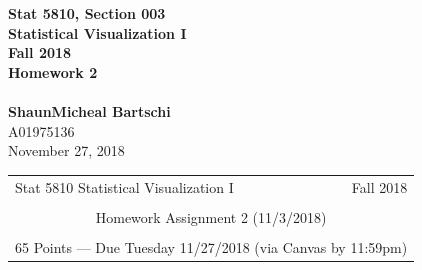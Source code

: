 \documentclass[12pt,letterpaper,final]{article}
\begin{document}


\begin{titlepage}
\vspace*{4.5cm}
\begin{center}
{\LARGE \bf Stat 5810, Section 003} \\[0.5cm]
{\LARGE \bf Statistical Visualization I} \\[0.5cm]
{\LARGE \bf Fall 2018} \\[0.5cm]
{\LARGE \bf Homework 2} \\[0.5cm]
~ \\[2cm]
{\bf ShaunMicheal Bartschi} \\[0.3cm]
{A01975136} \\[0.3cm]
{November 27, 2018} \\[0.3cm]
\end{center}

\thispagestyle{empty}
\vfill
\end{titlepage}

\begin{table}\centering
\begin{tabular*}{6.15in}{@{\extracolsep{\fill}}|llr|} \hline
Stat 5810 Statistical Visualization I & \hspace*{0.5 in} & Fall 2018 \\
 & & \\
\multicolumn{3}{|c|}{
Homework Assignment 2 (11/3/2018)} \\
 & & \\
\multicolumn{3}{|c|}{
65 Points --- Due Tuesday 11/27/2018 (via Canvas by 11:59pm)} \\
\hline
\end{tabular*}
\end{table}
\end{document}

